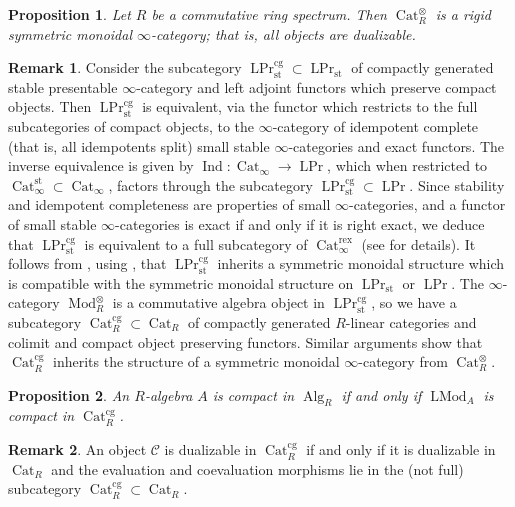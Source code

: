 \documentclass[12pt]{article}
\newtheorem{proposition}{Proposition}[subsection]
\theoremstyle{definition}
\newtheorem{remark}{Remark}[subsection]
\newcommand{\C}{\mathcal{C}}
\renewcommand{\i}{\infty}
\DeclareMathOperator{\LMod}{LMod}
\DeclareMathOperator{\Mod}{Mod}
\DeclareMathOperator{\Alg}{Alg}
\DeclareMathOperator{\Cat}{Cat}
\DeclareMathOperator{\Prl}{LPr}
\newcommand{\st}{\mathrm{st}}
\DeclareMathOperator{\Ind}{Ind}
\begin{document}
\begin{proposition}
Let $R$ be a commutative ring spectrum.
Then $\Cat_R^\otimes$ is a rigid symmetric monoidal $\i$-category; that is, all objects are dualizable.
\end{proposition}

\begin{remark}
Consider the subcategory
$
\Prl_{\st}^{\mathrm{cg}}\subset\Prl_{\st}
$
of compactly generated stable presentable $\infty$-category and left adjoint functors which preserve compact objects. Then $\Prl_{\st}^{\mathrm{cg}}$ is equivalent, via the functor which restricts to the full subcategories of compact objects, to the $\i$-category of idempotent complete (that is, all idempotents split) small stable $\i$-categories and exact functors.
The inverse equivalence is given by $\Ind:\Cat_\i\to\Prl$, which when restricted to $\Cat_\i^{\st}\subset\Cat_\i$, factors through the subcategory $\Prl_{\st}^{\mathrm{cg}}\subset\Prl$.
Since stability and idempotent completeness are properties of small $\i$-categories, and a functor of small stable $\i$-categories is exact if and only if it is right exact, we deduce that $\Prl_{\st}^\mathrm{cg}$ is equivalent to a full subcategory of $\Cat_\i^\mathrm{rex}$ (see \cite[Proposition 5.5.7.8]{HTT} for details).
It follows from \cite[Proposition 4.8.1.4]{HA}, using \cite[Remark 2.2.1.2]{HA}, that $\Prl_{\st}^\mathrm{cg}$ inherits a symmetric monoidal structure which is compatible with the symmetric monoidal structure on $\Prl_{\st}$ or $\Prl$.
The $\infty$-category $\Mod_R^\otimes$ is a commutative algebra object in
$\Prl_{\st}^{\mathrm{cg}}$, so we have a subcategory $\Cat_{R}^{\mathrm{cg}}\subset\Cat_R$ of compactly
generated $R$-linear categories and colimit and compact object preserving functors.
Similar arguments show that $\Cat_{R}^{\mathrm{cg}}$ inherits the structure of a symmetric monoidal $\i$-category from $\Cat_R^\otimes$.
\end{remark}

\begin{proposition}{\em \cite[Proposition 3.5]{AG14}}\label{prop:Acpt}
An $R$-algebra $A$ is compact in $\Alg_R$ if and only if $\LMod_A$ is compact in $\Cat_{R}^{\mathrm{cg}}$.
\end{proposition}

\begin{remark}
An object $\C$ is dualizable in $\Cat_{R}^{\mathrm{cg}}$ if and only if it is dualizable in $\Cat_R$ and the evaluation and coevaluation morphisms lie in the (not full) subcategory $\Cat_{R}^{\mathrm{cg}}\subset\Cat_R$.
\end{remark}
\end{document}
